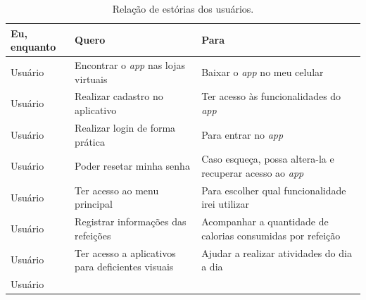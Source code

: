 \begin{table}[htb]
    \begin{center}
        \ABNTEXfontereduzida
        \caption{Relação de estórias dos usuários.}
        \label{tab-est-usr}
        \begin{tabular}{p{2.0cm}|p{5.0cm}|p{7.0cm}}
            \textbf{Eu, enquanto}                             & \textbf{Quero} & \textbf{Para}           \\
            \hline
            Usuário                                           &
            Encontrar o \emph{app} nas lojas virtuais         &
            Baixar o \emph{app} no meu celular                                                           \\
            \hline
            Usuário                                           &
            Realizar cadastro no aplicativo                   &
            Ter acesso às funcionalidades do \emph{app}                                                  \\
            \hline
            Usuário                                           &
            Realizar login de forma prática                   &
            Para entrar no \emph{app}                                                                    \\
            \hline
            Usuário                                           &
            Poder resetar minha senha                         &
            Caso esqueça, possa altera-la e recuperar acesso ao \emph{app}                               \\
            \hline
            Usuário                                           &
            Ter acesso ao menu principal                      &
            Para escolher qual funcionalidade irei utilizar                                              \\
            \hline
            Usuário                                           &
            Registrar informações das refeições               &
            Acompanhar a quantidade de calorias consumidas por refeição                                  \\
            \hline
            Usuário                                           &
            Ter acesso a aplicativos para deficientes visuais &
            Ajudar a realizar atividades do dia a dia                                                    \\
            \hline
            Usuário                                           &

\end{tabular}
\end{center}
\end{table}
